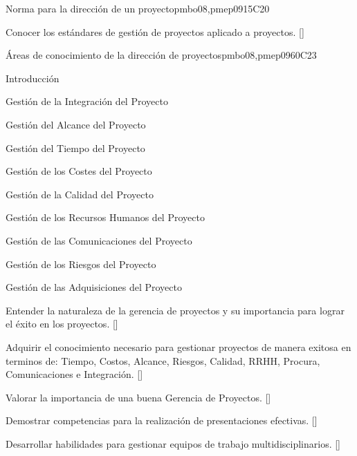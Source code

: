 \begin{syllabus}
\begin{unit}{Norma para la dirección de un proyecto}{}{pmbo08,pmep09}{15}{C20}
   \begin{learningoutcomes}
      \item Conocer los estándares de gestión de proyectos aplicado a proyectos. [\Usage]
   \end{learningoutcomes}
\end{unit}

\begin{unit}{Áreas de conocimiento de la dirección de proyectos}{}{pmbo08,pmep09}{60}{C23}
\begin{topics}
      \item Introducción
      \item Gestión de la Integración del Proyecto
      \item Gestión del Alcance del Proyecto
      \item Gestión del Tiempo del Proyecto
      \item Gestión de los Costes del Proyecto
      \item Gestión de la Calidad del Proyecto
      \item Gestión de los Recursos Humanos del Proyecto
      \item Gestión de las Comunicaciones del Proyecto
      \item Gestión de los Riesgos del Proyecto
      \item Gestión de las Adquisiciones del Proyecto
   \end{topics}

   \begin{learningoutcomes}
      \item Entender la naturaleza de la gerencia de proyectos y su importancia para lograr el éxito en los proyectos. [\Assessment]
      \item Adquirir el conocimiento necesario para gestionar proyectos de manera exitosa en terminos de: Tiempo, Costos, Alcance, Riesgos, Calidad, RRHH, Procura, Comunicaciones e Integración. [\Usage]
       \item Valorar la importancia de una buena Gerencia de Proyectos. [\Assessment]
      \item Demostrar competencias para la realización de presentaciones efectivas. [\Usage]
      \item Desarrollar habilidades para gestionar equipos de trabajo multidisciplinarios. [\Usage]
   \end{learningoutcomes}
\end{unit}




\begin{coursebibliography}
\end{coursebibliography}

\end{syllabus}
